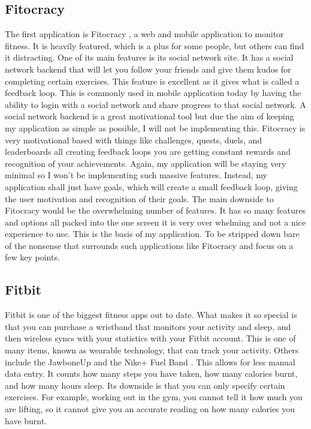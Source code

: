 \subsection{Fitocracy}
The first application is Fitocracy \citep{fitocracy:2007}, a web and mobile application to monitor fitness. It is heavily featured, which is a plus for some people, but others can find it distracting. One of its main features is its social network site. It has a social network backend that will let you follow your friends and give them kudos for completing certain exercises. This feature is excellent as it gives what is called a feedback loop. This is commonly used in mobile application today by having the ability to login with a social network and share progress to that social network. A social network backend is a great motivational tool but due the aim of keeping my application as simple as possible, I will not be implementing this. Fitocracy is very motivational based with things like challenges, quests, duels, and leaderboards all creating feedback loops you are getting constant rewards and recognition of your achievements. Again, my application will be staying very minimal so I won’t be implementing such massive features. Instead, my application shall just have goals, which will create a small feedback loop, giving the user motivation and recognition of their goals. The main downside to Fitocracy would be the overwhelming number of features. It has so many features and options all packed into the one screen it is very over whelming and not a nice experience to use. This is the basis of my application. To be stripped down bare of the nonsense that surrounds such applications like Fitocracy and focus on a few key points.


\subsection{Fitbit}
Fitbit is one of the biggest fitness apps out to date. What makes it so special is that you can purchase a wristband that monitors your activity and sleep, and then wireless syncs with your statistics with your Fitbit account. This is one of many items, known as wearable technology, that can track your activity. Others include the JawboneUp \citep{jawbone:2011} and the Nike+ Fuel Band \citep{nikefuelband:2012}. This allows for less manual data entry. It counts how many steps you have taken, how many calories burnt, and how many hours sleep. Its downside is that you can only specify certain exercises. For example, working out in the gym, you cannot tell it how much you are lifting, so it cannot give you an accurate reading on how many calories you have burnt.

